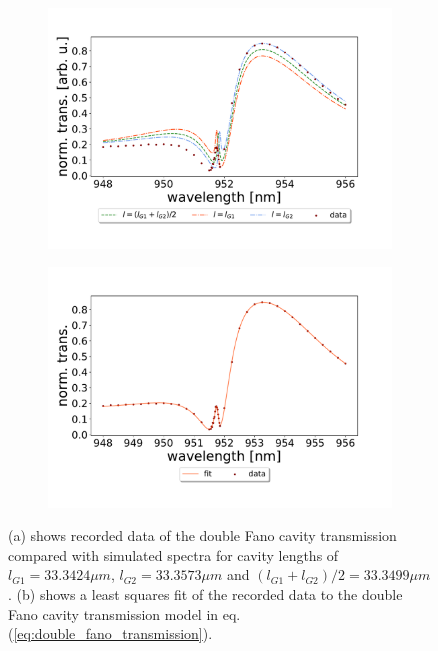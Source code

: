 \begin{figure}[h!]
    \centering
    \begin{subfigure}[b]{0.49\textwidth}
        \centering
        \includegraphics[width=\textwidth]{figures/results/34um_long_scan_sim_comparison.pdf}
        \caption{}
        \label{fig:34um_long_scan_sim_comparison}
    \end{subfigure}
    \begin{subfigure}[b]{0.49\textwidth}
        \centering
        \includegraphics[width=\textwidth]{figures/results/34um_long_scan_fit.pdf}
        \caption{}
        \label{fig:34um_long_scan_fit}
    \end{subfigure}
    \caption{(a) shows recorded data of the double Fano cavity transmission compared with simulated spectra for cavity lengths of $l_{G1} = 33.3424 \mu m$, $l_{G2} = 33.3573 \mu m$ and $(l_{G1} + l_{G2})/2 = 33.3499 \mu m$. (b) shows a least squares fit of the recorded data to the double Fano cavity transmission model in eq. (\ref{eq:double_fano_transmission}).}
    \label{fig:34um_cavity_fit_and_sim}
\end{figure}


